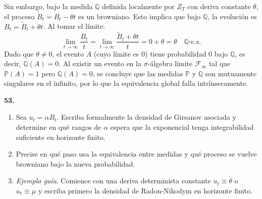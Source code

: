 \documentclass[11pt, letterpaper]{article}
\begin{document}
\begin{solucion}
    Sin embargo, bajo la medida $\mathbb{Q}$ definida localmente por $Z_T$ con deriva constante $\theta$, el proceso $\tilde{B}_t = B_t - \theta t$ es un browniano. Esto implica que bajo $\mathbb{Q}$, la evolución es $B_t = \tilde{B}_t + \theta t$. 
    Al tomar el límite:
    \[ \lim_{t \to \infty} \frac{B_t}{t} = \lim_{t \to \infty} \frac{\tilde{B}_t + \theta t}{t} = 0 + \theta = \theta \quad \mathbb{Q}\text{-c.s.} \]
    Dado que $\theta \neq 0$, el evento $A$ (cuyo límite es 0) tiene probabilidad 0 bajo $\mathbb{Q}$, es decir, $\mathbb{Q}(A) = 0$.
    Al existir un evento en la $\sigma$-álgebra límite $\mathcal{F}_\infty$ tal que $\mathbb{P}(A) = 1$ pero $\mathbb{Q}(A) = 0$, se concluye que las medidas $\mathbb{P}$ y $\mathbb{Q}$ son mutuamente singulares en el infinito, por lo que la equivalencia global falla intrínsecamente.
\end{solucion}

\newpage

\begin{ejercicio}
    \textbf{53.} 
    \begin{enumerate}
        \item Sea $u_{t}=\alpha B_{t}$. Escriba formalmente la densidad de Girsanov asociada y determine en qué rangos de $\alpha$ espera que la exponencial tenga integrabilidad suficiente en horizonte finito.
        \item Precise en qué paso usa la equivalencia entre medidas y qué proceso se vuelve browniano bajo la nueva probabilidad.
        \item \textit{Ejemplo guía}. Comience con una deriva determinista constante $u_{t}\equiv\theta$ o $u_{t}\equiv\mu$ y escriba primero la densidad de Radon-Nikodym en horizonte finito.
    \end{enumerate}
\end{ejercicio}

\vspace{5mm}
\end{document}
